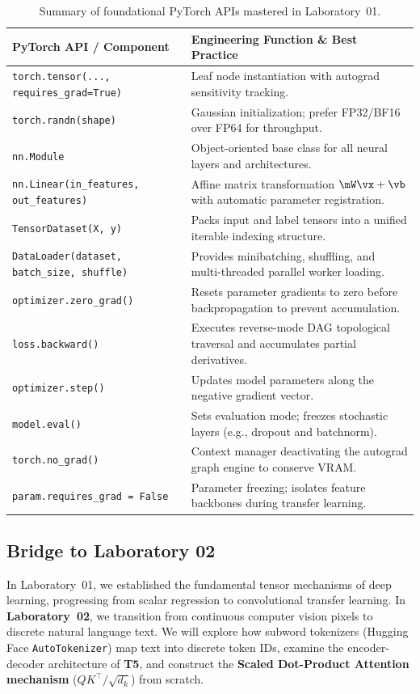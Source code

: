 \documentclass[../labs.tex]{subfiles}
\begin{document}
\begin{table}[htbp]
\centering
\small
\begin{tabularx}{\textwidth}{l >{\raggedright\arraybackslash}X}
\toprule
\textbf{PyTorch API / Component} & \textbf{Engineering Function \& Best Practice} \\
\midrule
\texttt{torch.tensor(..., requires\_grad=True)} & Leaf node instantiation with autograd sensitivity tracking. \\
\texttt{torch.randn(shape)} & Gaussian initialization; prefer FP32/BF16 over FP64 for throughput. \\
\texttt{nn.Module} & Object-oriented base class for all neural layers and architectures. \\
\texttt{nn.Linear(in\_features, out\_features)} & Affine matrix transformation $\mW \vx + \vb$ with automatic parameter registration. \\
\texttt{TensorDataset(X, y)} & Packs input and label tensors into a unified iterable indexing structure. \\
\texttt{DataLoader(dataset, batch\_size, shuffle)} & Provides minibatching, shuffling, and multi-threaded parallel worker loading. \\
\texttt{optimizer.zero\_grad()} & Resets parameter gradients to zero before backpropagation to prevent accumulation. \\
\texttt{loss.backward()} & Executes reverse-mode DAG topological traversal and accumulates partial derivatives. \\
\texttt{optimizer.step()} & Updates model parameters along the negative gradient vector. \\
\texttt{model.eval()} & Sets evaluation mode; freezes stochastic layers (e.g., dropout and batchnorm). \\
\texttt{torch.no\_grad()} & Context manager deactivating the autograd graph engine to conserve VRAM. \\
\texttt{param.requires\_grad = False} & Parameter freezing; isolates feature backbones during transfer learning. \\
\bottomrule
\end{tabularx}
\caption{Summary of foundational PyTorch APIs mastered in Laboratory~01.}
\label{tab:lab01_summary}
\end{table}

\subsection{Bridge to Laboratory 02}
In Laboratory~01, we established the fundamental tensor mechanisms of deep learning, progressing from scalar regression to convolutional transfer learning. In \textbf{Laboratory~02}, we transition from continuous computer vision pixels to discrete natural language text. We will explore how subword tokenizers (Hugging Face \texttt{AutoTokenizer}) map text into discrete token IDs, examine the encoder-decoder architecture of \textbf{T5}, and construct the \textbf{Scaled Dot-Product Attention mechanism} ($QK^\top / \sqrt{d_k}$) from scratch.
\end{document}
